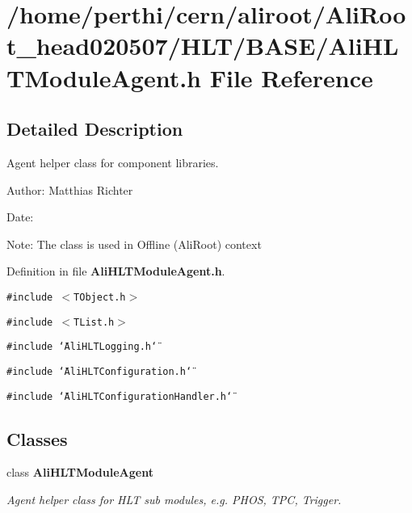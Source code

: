 \section{/home/perthi/cern/aliroot/Ali\-Root\_\-head020507/HLT/BASE/Ali\-HLTModule\-Agent.h File Reference}
\label{AliHLTModuleAgent_8h}


\subsection{Detailed Description}
Agent helper class for component libraries. 

\begin{Desc}
\item[Author:]Matthias Richter \end{Desc}
\begin{Desc}
\item[Date:]\end{Desc}
\begin{Desc}
\item[Note:]The class is used in Offline (Ali\-Root) context\end{Desc}


Definition in file {\bf Ali\-HLTModule\-Agent.h}.

{\tt \#include $<$TObject.h$>$}\par
{\tt \#include $<$TList.h$>$}\par
{\tt \#include \char`\"{}Ali\-HLTLogging.h\char`\"{}}\par
{\tt \#include \char`\"{}Ali\-HLTConfiguration.h\char`\"{}}\par
{\tt \#include \char`\"{}Ali\-HLTConfiguration\-Handler.h\char`\"{}}\par
\subsection*{Classes}
\begin{CompactItemize}
\item 
class {\bf Ali\-HLTModule\-Agent}
\begin{CompactList}\small\item\em Agent helper class for HLT sub modules, e.g. PHOS, TPC, Trigger. \item\end{CompactList}\end{CompactItemize}
